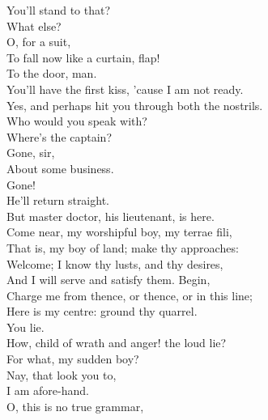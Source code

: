 \documentclass[a4paper,oneside]{memoir}
\begin{document}
\begin{drama*}
You'll stand to that?\\
\subtlespeaks {} What else?\\
\facespeaks {} O, for a suit,\\
To fall now like a curtain, flap!\\
\subtlespeaks {} To the door, man.\\
\facespeaks You'll have the first kiss, 'cause I am not ready.\\
\subtlespeaks Yes, and perhaps hit you through both the nostrils.\\
\facespeaks {} Who would you speak with?\\
\kastrilspeaks {}  Where's the captain?\\
\facespeaks {}  Gone, sir,\\
About some business.\\
\kastrilspeaks {}  Gone!\\
\facespeaks {}  He'll return straight.\\
But master doctor, his lieutenant, is here.\\
\subtlespeaks Come near, my worshipful boy, my terrae fili,\\
That is, my boy of land; make thy approaches:\\
Welcome; I know thy lusts, and thy desires,\\
And I will serve and satisfy them. Begin,\\
Charge me from thence, or thence, or in this line;\\
Here is my centre: ground thy quarrel.\\
\kastrilspeaks {} You lie.\\
\subtlespeaks How, child of wrath and anger! the loud lie?\\
For what, my sudden boy?\\
\kastrilspeaks {} Nay, that look you to,\\
I am afore-hand.\\
\subtlespeaks {} O, this is no true grammar,\\

\end{drama*}
\end{document}
